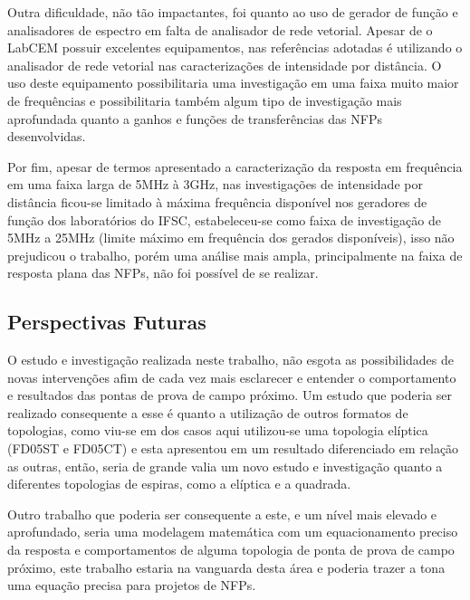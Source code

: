 Outra dificuldade, não tão impactantes, foi quanto ao uso de gerador de função e analisadores de espectro em falta de analisador de rede vetorial. Apesar de o LabCEM possuir excelentes equipamentos, nas referências adotadas é utilizando o analisador de rede vetorial nas caracterizações de intensidade por distância. O uso deste equipamento possibilitaria uma investigação em uma faixa muito maior de frequências e possibilitaria também algum tipo de investigação mais aprofundada quanto a ganhos e funções de transferências das NFPs desenvolvidas.

Por fim, apesar de termos apresentado a caracterização da resposta em frequência em uma faixa larga de 5MHz à 3GHz, nas investigações de intensidade por distância ficou-se limitado à máxima frequência disponível nos geradores de função dos laboratórios do IFSC, estabeleceu-se como faixa de investigação de 5MHz a 25MHz (limite máximo em frequência dos gerados disponíveis), isso não prejudicou o trabalho, porém uma análise mais ampla, principalmente na faixa de resposta plana das NFPs, não foi possível de se realizar.

\subsection{Perspectivas Futuras}
O estudo e investigação realizada neste trabalho, não esgota as possibilidades de novas intervenções afim de cada vez mais esclarecer e entender o comportamento e resultados das pontas de prova de campo próximo. Um estudo que poderia ser realizado consequente a esse é quanto a utilização de outros formatos de topologias, como viu-se em dos casos aqui utilizou-se uma topologia elíptica (FD05ST e FD05CT) e esta apresentou em um resultado diferenciado em relação as outras, então, seria de grande valia um novo estudo e investigação quanto a diferentes topologias de espiras, como a elíptica e a quadrada.

Outro trabalho que poderia ser consequente a este, e um nível mais elevado e aprofundado, seria uma modelagem matemática com um equacionamento preciso da resposta e comportamentos de alguma topologia de ponta de prova de campo próximo, este trabalho estaria na vanguarda desta área e poderia trazer a tona uma equação precisa para projetos de NFPs.

